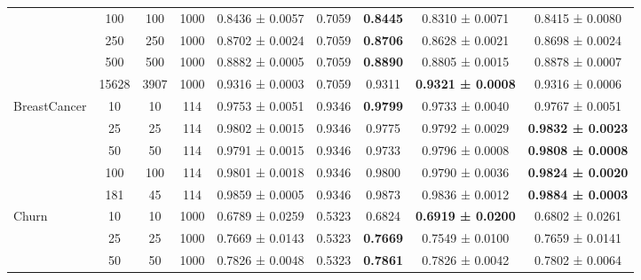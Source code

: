 \begin{table}
{\begin{tabular}[H]{@{}lcccccccc@{}}
                              & 100   & 100  & 1000 & 0.8436 ± 0.0057      & 0.7059               & \textbf{0.8445} & 0.8310 ± 0.0071          & 0.8415 ± 0.0080          \\
                              & 250   & 250  & 1000 & 0.8702 ± 0.0024      & 0.7059               & \textbf{0.8706} & 0.8628 ± 0.0021          & 0.8698 ± 0.0024          \\
                              & 500   & 500  & 1000 & 0.8882 ± 0.0005      & 0.7059               & \textbf{0.8890} & 0.8805 ± 0.0015          & 0.8878 ± 0.0007          \\
                              & 15628 & 3907 & 1000 & 0.9316 ± 0.0003      & 0.7059               & 0.9311          & \textbf{0.9321 ± 0.0008} & 0.9316 ± 0.0006          \\
                              \midrule
\multirow{5}{*}{BreastCancer} & 10    & 10   & 114  & 0.9753 ± 0.0051      & 0.9346               & \textbf{0.9799} & 0.9733 ± 0.0040          & 0.9767 ± 0.0051          \\
                              & 25    & 25   & 114  & 0.9802 ± 0.0015      & 0.9346               & 0.9775          & 0.9792 ± 0.0029          & \textbf{0.9832 ± 0.0023} \\
                              & 50    & 50   & 114  & 0.9791 ± 0.0015      & 0.9346               & 0.9733          & 0.9796 ± 0.0008          & \textbf{0.9808 ± 0.0008} \\
                              & 100   & 100  & 114  & 0.9801 ± 0.0018      & 0.9346               & 0.9800          & 0.9790 ± 0.0036          & \textbf{0.9824 ± 0.0020} \\
                              & 181   & 45   & 114  & 0.9859 ± 0.0005      & 0.9346               & 0.9873          & 0.9836 ± 0.0012          & \textbf{0.9884 ± 0.0003} \\
                              \midrule
\multirow{7}{*}{Churn}        & 10    & 10   & 1000 & 0.6789 ± 0.0259      & 0.5323               & 0.6824          & \textbf{0.6919 ± 0.0200} & 0.6802 ± 0.0261          \\
                              & 25    & 25   & 1000 & 0.7669 ± 0.0143      & 0.5323               & \textbf{0.7669} & 0.7549 ± 0.0100          & 0.7659 ± 0.0141          \\
                              & 50    & 50   & 1000 & 0.7826 ± 0.0048      & 0.5323               & \textbf{0.7861} & 0.7826 ± 0.0042          & 0.7802 ± 0.0064          \\

\end{tabular}}
\end{table}
